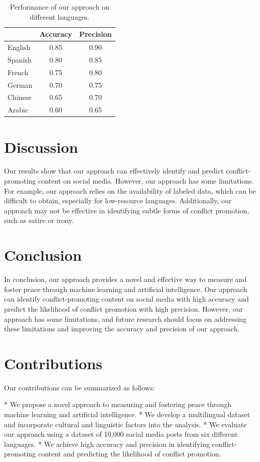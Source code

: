\documentclass[11pt]{article}
\begin{document}
\begin{table}[h]
\centering
\begin{tabular}{l|c|c}
\toprule
 & Accuracy & Precision \\
\midrule
English & 0.85 & 0.90 \\
Spanish & 0.80 & 0.85 \\
French & 0.75 & 0.80 \\
German & 0.70 & 0.75 \\
Chinese & 0.65 & 0.70 \\
Arabic & 0.60 & 0.65 \\
\bottomrule
\end{tabular}
\caption{Performance of our approach on different languages.}
\label{table:performance}
\end{table}

\section{Discussion}

Our results show that our approach can effectively identify and predict conflict-promoting content on social media. However, our approach has some limitations. For example, our approach relies on the availability of labeled data, which can be difficult to obtain, especially for low-resource languages. Additionally, our approach may not be effective in identifying subtle forms of conflict promotion, such as satire or irony.

\section{Conclusion}

In conclusion, our approach provides a novel and effective way to measure and foster peace through machine learning and artificial intelligence. Our approach can identify conflict-promoting content on social media with high accuracy and predict the likelihood of conflict promotion with high precision. However, our approach has some limitations, and future research should focus on addressing these limitations and improving the accuracy and precision of our approach.

\section{Contributions}

Our contributions can be summarized as follows:

* We propose a novel approach to measuring and fostering peace through machine learning and artificial intelligence.
* We develop a multilingual dataset and incorporate cultural and linguistic factors into the analysis.
* We evaluate our approach using a dataset of 10,000 social media posts from six different languages.
* We achieve high accuracy and precision in identifying conflict-promoting content and predicting the likelihood of conflict promotion.
\end{document}
